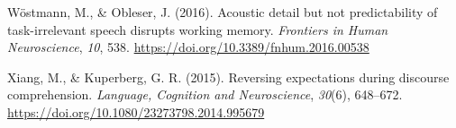 \documentclass[a4paper, nobind]{templates/ociamthesis}
\newlength{\cslhangindent}
\newenvironment{CSLReferences}[2] %
 {%
  \setlength{\parindent}{0pt}
  \ifodd #1
  \let\oldpar\par
  \def\par{\hangindent=\cslhangindent\oldpar}
  \fi
  \setlength{\parskip}{1mm}
  \setlength{\baselineskip}{6mm}
 }%
 {}
\begin{document}
\begin{CSLReferences}{1}{0}
\leavevmode{}%
Wöstmann, M., \& Obleser, J. (2016). Acoustic detail but not predictability of task-irrelevant speech disrupts working memory. \emph{Frontiers in Human Neuroscience}, \emph{10}, 538. \url{https://doi.org/10.3389/fnhum.2016.00538}

\leavevmode{}%
Xiang, M., \& Kuperberg, G. R. (2015). {Reversing expectations during discourse comprehension}. \emph{Language, Cognition and Neuroscience}, \emph{30}(6), 648--672. \url{https://doi.org/10.1080/23273798.2014.995679}

\end{CSLReferences}

\end{document}
